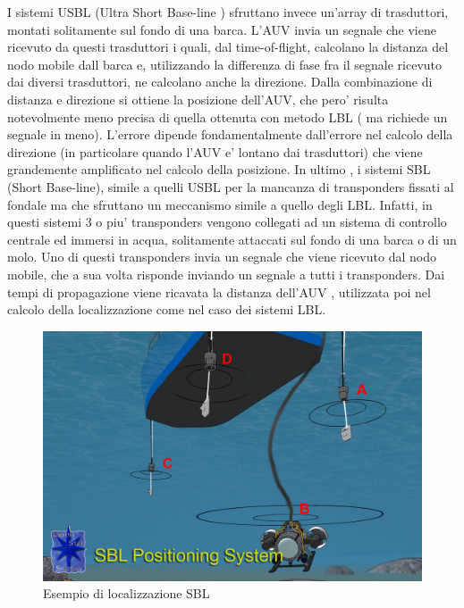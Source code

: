 I sistemi USBL (Ultra Short Base-line ) sfruttano invece un'array di trasduttori, montati solitamente sul fondo di una barca. L'AUV invia un segnale che viene ricevuto da questi trasduttori i quali, dal time-of-flight, calcolano la distanza del nodo mobile dall barca e, utilizzando la differenza di fase fra il segnale ricevuto dai diversi trasduttori, ne calcolano anche la direzione. Dalla combinazione di distanza e direzione si ottiene la posizione dell'AUV, che pero' risulta notevolmente meno precisa di quella ottenuta con metodo LBL ( ma richiede un segnale in meno). L'errore dipende fondamentalmente dall'errore nel calcolo della direzione (in particolare quando l'AUV e' lontano dai trasduttori) che viene grandemente amplificato nel calcolo della posizione. \newline
In ultimo , i sistemi SBL (Short Base-line), simile a quelli USBL per la mancanza di transponders fissati al fondale ma che sfruttano un meccanismo simile a quello degli LBL. Infatti, in questi sistemi 3 o piu' transponders vengono collegati ad un sistema di controllo centrale ed immersi in acqua, solitamente attaccati sul fondo di una barca o di un molo. Uno di questi transponders invia un segnale che viene ricevuto dal nodo mobile, che a sua volta risponde inviando un segnale a tutti i transponders. Dai tempi di propagazione viene ricavata la distanza dell'AUV , utilizzata poi nel calcolo della localizzazione come nel caso dei sistemi LBL.

\begin{figure}[H]
	\centering
	\includegraphics[scale=0.25]{SBL.jpg}
	\caption{ Esempio di localizzazione SBL}
	\label{fig:SBL}
\end{figure}


